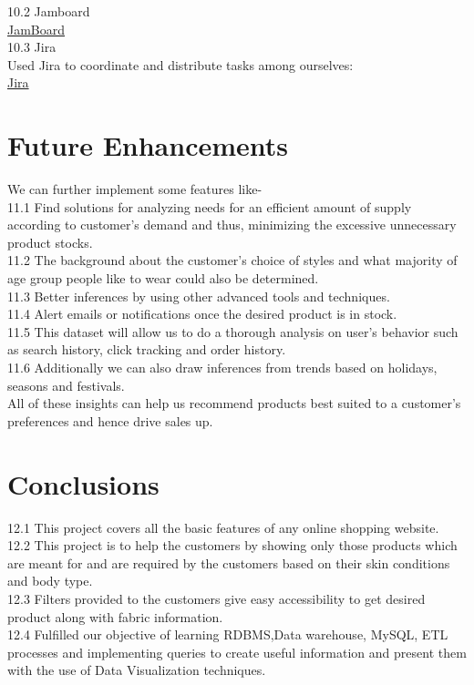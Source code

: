 \documentclass[11pt,journal,compsoc]{IEEEtran}
\begin{document}
10.2 Jamboard \\
\href{https://jamboard.google.com/d/1tzFwo7YGP86Y_Ly8sz05kr6Hp795oHY9Qj919PjHjvs/viewer}{JamBoard} \\

10.3 Jira \\
Used Jira to coordinate and distribute tasks among ourselves: \\  \href{https://dbms-project-group6.atlassian.net/jira/software/projects/HDPG/boards/1/roadmap}{Jira} \\

\section{Future Enhancements}
We can further implement some features like- \\
11.1 Find solutions for analyzing needs for an efficient amount of supply according to customer’s demand and thus, minimizing the excessive unnecessary product stocks. \\
11.2 The background about the customer’s choice of styles and what majority of age group people like to wear could also be determined. \\
11.3 Better inferences by using other advanced tools and techniques. \\
11.4 Alert emails or notifications once the desired product is in stock. \\
11.5 This dataset will allow us to do a thorough analysis on user's behavior such as search history, click tracking and order history. \\
11.6 Additionally we can also draw inferences from trends based on holidays, seasons and festivals. \\
All of these insights can help us recommend products best suited to a customer's preferences and hence drive sales up.

\section{Conclusions}
12.1 This project covers all the basic features of any online shopping website. \\
12.2 This project is to help the customers by showing only those products which are meant for and are required by the customers based on their skin conditions and body type. \\
12.3 Filters provided to the customers give easy accessibility to get desired product along with fabric information. \\
12.4 Fulfilled our objective of learning RDBMS,Data warehouse, MySQL, ETL processes  and implementing queries to create useful information and present them with the use of Data Visualization techniques. \\
\end{document}
